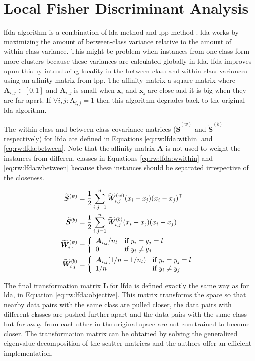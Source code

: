 \documentclass[12pt,a4paper]{report}
\begin{document}
\section{Local Fisher Discriminant Analysis} \label{chap:rw:lfda}
\acf{lfda} algorithm \citep{sugiyama2007dimensionality} is a combination of \acf{lda} method \citep{fisher1936use} and \acf{lpp} method \citep{he2003locality}. \ac{lda} works by maximizing the amount of between-class variance relative to the amount of within-class variance. This might be problem when instances from one class form more clusters because these variances are calculated globally in \ac{lda}. \ac{lfda} improves upon this by introducing locality in the between-class and within-class variances using an affinity matrix from \ac{lpp}. The affinity matrix a square matrix where $\bm{A}_{i,j} \in [0,1]$ and $\bm{A}_{i,j}$ is small when $\bm{x}_i$ and $\bm{x}_j$ are close and it is big when they are far apart. If $\forall i,j: \bm{A}_{i,j}=1$ then this algorithm degrades back to the original \ac{lda} algorithm.

The within-class and between-class covariance matrices ($\widetilde{\bm{S}}^{(w)}$ and $\widetilde{\bm{S}}^{(b)}$ respectively) for \ac{lfda} are defined in Equations \ref{eq:rw:lfda:within} and \ref{eq:rw:lfda:between}. Note that the affinity matrix $\bm{A}$ is not used to weight the instances from different classes in Equations \ref{eq:rw:lfda:wwithin} and \ref{eq:rw:lfda:wbetween} because these instances should be separated irrespective of the closeness.

\begin{align}
\widetilde{\bm{S}}^{(w)} &= \frac{1}{2} \sum_{i,j=1}^n \widetilde{\bm{W}}_{i,j}^{(w)} (x_i-x_j)(x_i-x_j)^\top \label{eq:rw:lfda:within}
\\
\widetilde{\bm{S}}^{(b)} &= \frac{1}{2} \sum_{i,j=1}^n \widetilde{\bm{W}}_{i,j}^{(b)} (x_i-x_j)(x_i-x_j)^\top \label{eq:rw:lfda:between}
\\
\widetilde{\bm{W}}_{i,j}^{(w)} &= \left\{ \begin{array}{ll} \bm{A}_{i,j}/n_l & \mbox{if } y_i=y_j=l \\ 0 & \mbox{if } y_i \neq y_j \end{array} \right. \label{eq:rw:lfda:wwithin}
\\
\widetilde{\bm{W}}_{i,j}^{(b)} &= \left\{ \begin{array}{ll} \bm{A}_{i,j}(1/n-1/n_l) & \mbox{if } y_i=y_j=l \\ 1/n & \mbox{if } y_i \neq y_j \end{array} \right. \label{eq:rw:lfda:wbetween}
\end{align}

The final transformation matrix $\bm{L}$ for \ac{lfda} is defined exactly the same way as for \ac{lda}, in Equation \ref{eq:rw:lfda:objective}. This matrix transforms the space so that nearby data pairs with the same class are pulled closer, the data pairs with different classes are pushed further apart and the data pairs with the same class but far away from each other in the original space are not constrained to become closer. The transformation matrix can be obtained by solving the generalized eigenvalue decomposition of the scatter matrices and the authors offer an efficient implementation.
\end{document}
